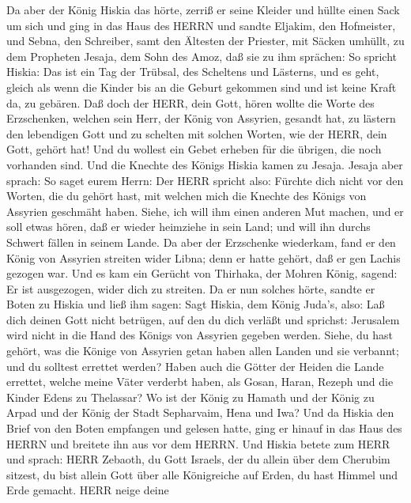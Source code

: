  Da aber der König Hiskia das hörte, zerriß er seine Kleider
und hüllte einen Sack um sich und ging in das Haus des HERRN
 und sandte Eljakim, den Hofmeister, und Sebna, den
Schreiber, samt den Ältesten der Priester, mit Säcken umhüllt, zu dem
Propheten Jesaja, dem Sohn des Amoz,  daß sie zu ihm
sprächen: So spricht Hiskia: Das ist ein Tag der Trübsal, des Scheltens
und Lästerns, und es geht, gleich als wenn die Kinder bis an die Geburt
gekommen sind und ist keine Kraft da, zu gebären.  Daß doch
der HERR, dein Gott, hören wollte die Worte des Erzschenken, welchen
sein Herr, der König von Assyrien, gesandt hat, zu lästern den
lebendigen Gott und zu schelten mit solchen Worten, wie der HERR, dein
Gott, gehört hat! Und du wollest ein Gebet erheben für die übrigen, die
noch vorhanden sind.  Und die Knechte des Königs Hiskia
kamen zu Jesaja.  Jesaja aber sprach: So saget eurem Herrn:
Der HERR spricht also: Fürchte dich nicht vor den Worten, die du gehört
hast, mit welchen mich die Knechte des Königs von Assyrien geschmäht
haben.  Siehe, ich will ihm einen anderen Mut machen, und er
soll etwas hören, daß er wieder heimziehe in sein Land; und will ihn
durchs Schwert fällen in seinem Lande.  Da aber der
Erzschenke wiederkam, fand er den König von Assyrien streiten wider
Libna; denn er hatte gehört, daß er gen Lachis gezogen war. 
Und es kam ein Gerücht von Thirhaka, der Mohren König, sagend: Er ist
ausgezogen, wider dich zu streiten.  Da er nun solches
hörte, sandte er Boten zu Hiskia und ließ ihm sagen: Sagt Hiskia, dem
König Juda's, also: Laß dich deinen Gott nicht betrügen, auf den du dich
verläßt und sprichst: Jerusalem wird nicht in die Hand des Königs von
Assyrien gegeben werden.  Siehe, du hast gehört, was die
Könige von Assyrien getan haben allen Landen und sie verbannt; und du
solltest errettet werden?  Haben auch die Götter der Heiden
die Lande errettet, welche meine Väter verderbt haben, als Gosan, Haran,
Rezeph und die Kinder Edens zu Thelassar?  Wo ist der König
zu Hamath und der König zu Arpad und der König der Stadt Sepharvaim,
Hena und Iwa?  Und da Hiskia den Brief von den Boten
empfangen und gelesen hatte, ging er hinauf in das Haus des HERRN und
breitete ihn aus vor dem HERRN.  Und Hiskia betete zum HERR
und sprach:  HERR Zebaoth, du Gott Israels, der du allein
über dem Cherubim sitzest, du bist allein Gott über alle Königreiche auf
Erden, du hast Himmel und Erde gemacht.  HERR neige deine
